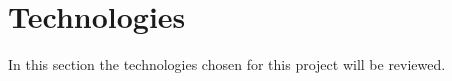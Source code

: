 \section{Technologies}

In this section the technologies chosen for this project will be reviewed.




